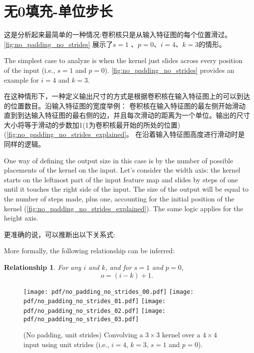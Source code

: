 \documentclass[notitlepage]{report}
\newtheorem{relationship}{Relationship}
\begin{document}
\section{无0填充-单位步长}

这是分析起来最简单的一种情况:卷积核只是从输入特征图的每个位置滑过。\autoref{fig:no_padding_no_strides}
展示了$s = 1$ 、$p = 0$、$i = 4$、$k =3$的情形。

The simplest case to analyze is when the kernel just slides across every
position of the input (i.e., $s = 1$ and $p = 0$).
\autoref{fig:no_padding_no_strides} provides an example for $i = 4$ and $k =
3$.

在这种情形下，一种定义输出尺寸的方式是根据卷积核在输入特征图上的可以到达的位置数目。沿输入特征图的宽度举例：
卷积核在输入特征图的最左侧开始滑动直到到达输入特征图的最右侧的边，并且每次滑动的距离为一个单位。输出的尺寸
大小将等于滑动的步数加1(1为卷积核最开始的所处的位置)(\autoref{fig:no_padding_no_strides_explained}。
在沿着输入特征图高度进行滑动时是同样的逻辑。

One way of defining the output size in this case is by the number of possible
placements of the kernel on the input. Let's consider the width axis: the kernel
starts on the leftmost part of the input feature map and slides by steps of one
until it touches the right side of the input. The size of the output will be
equal to the number of steps made, plus one, accounting for the initial position
of the kernel (\autoref{fig:no_padding_no_strides_explained}). The same logic
applies for the height axis.

更准确的说，可以推断出以下关系式:

More formally, the following relationship can be inferred:

\begin{relationship}\label{rel:no_padding_no_strides}
For any $i$ and $k$, and for $s = 1$ and $p = 0$,
\begin{equation*}
    o = (i - k) + 1.
\end{equation*}
\end{relationship}

\begin{figure}[p]
    \centering
    \texttt{[image: pdf/no\_padding\_no\_strides\_00.pdf]}
    \texttt{[image: pdf/no\_padding\_no\_strides\_01.pdf]}
    \texttt{[image: pdf/no\_padding\_no\_strides\_02.pdf]}
    \texttt{[image: pdf/no\_padding\_no\_strides\_03.pdf]}
    \caption{\label{fig:no_padding_no_strides} (No padding, unit strides)
        Convolving a $3 \times 3$ kernel over a $4 \times 4$ input using unit
        strides (i.e., $i = 4$, $k = 3$, $s = 1$ and $p = 0$).}
\end{figure}
\end{document}
